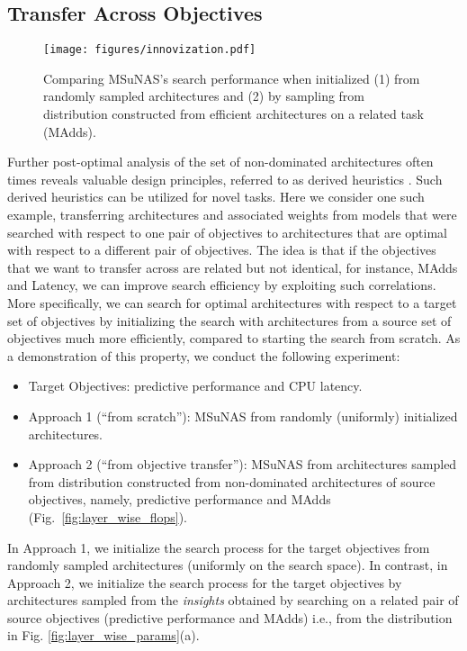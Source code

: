 \documentclass[runningheads]{llncs}
\def\ourmethod{MSuNAS}
\begin{document}
\subsection{Transfer Across Objectives\label{sec:transfer}}
\begin{figure}[!bht]
    \centering
    \texttt{[image: figures/innovization.pdf]}
    \caption{Comparing \ourmethod{}'s search performance when initialized (1) from randomly sampled architectures and (2) by sampling from distribution constructed from efficient architectures on a related task (MAdds).
    \label{fig:innovization}}
\end{figure}
Further post-optimal analysis of the set of non-dominated architectures often times reveals valuable design principles, referred to as derived heuristics \cite{derived_heuristics}. Such derived heuristics can be utilized for novel tasks. Here we consider one such example, transferring  architectures and  associated weights from models that were searched with respect to one pair of objectives to architectures that are optimal with respect to a different pair of objectives. The idea is that if the objectives that we want to transfer across are related but not identical, for instance, MAdds and Latency, we can improve search efficiency by exploiting such correlations. More specifically, we can search for  optimal architectures with respect to a target set of objectives by initializing the search with  architectures from a source set of objectives much more efficiently,  compared to starting the search from scratch. As a demonstration of this property, we conduct the following experiment:
\begin{itemize}
    \item Target Objectives: predictive performance and CPU latency.
    \item Approach 1 (``from scratch''): \ourmethod{} from randomly (uniformly) initialized architectures.
    \item Approach 2 (``from objective transfer''): \ourmethod{} from architectures sampled from distribution constructed from non-dominated architectures of source objectives, namely, predictive performance and MAdds (Fig.~\ref{fig:layer_wise_flops}).
\end{itemize}

In Approach 1, we initialize the search process for the target objectives from randomly sampled architectures (uniformly on the search space). In contrast, in Approach 2, we initialize the search process for the target objectives by architectures sampled from the \emph{insights} obtained by searching on a related pair of source objectives (predictive performance and MAdds) i.e., from the distribution in Fig. \ref{fig:layer_wise_params}(a).
\end{document}
